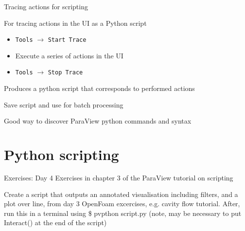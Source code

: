 \documentclass{beamer}
\begin{document}
\begin{frame}{Tracing actions for scripting}
    
    For tracing actions in the UI as a Python script
    \begin{itemize}
        \item \texttt{Tools} $\rightarrow$ \texttt{Start Trace}
        \item Execute a series of actions in the UI
        \item \texttt{Tools} $\rightarrow$ \texttt{Stop Trace}
    \end{itemize}{}
    Produces a python script that corresponds to performed actions
    
    \vskip 6pt
    
    Save script and use for batch processing
    
    \vskip 6pt
    
    Good way to discover ParaView python commands and syntax
    
\end{frame}{}

\section{Python scripting}

\begin{frame}{Exercises: Day 4}
    Exercises in chapter 3 of the ParaView tutorial on scripting  
    
    \vskip 24pt
    
    Create a script that outputs an annotated visualisation including filters, and a plot over line, from day 3 OpenFoam excercises, e.g. cavity flow tutorial. After, run this in a terminal using \$ pvpthon script.py (note, may be necessary to put Interact() at the end of the script)
\end{frame}{}
\end{document}
